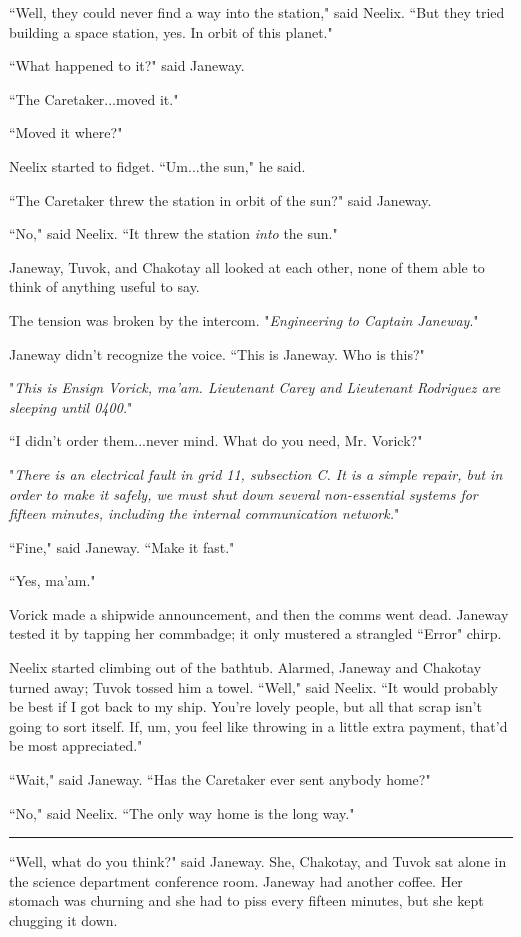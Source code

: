 \documentclass[twoside,letterpaper,12pt]{memoir}
\begin{document}
``Well, they could never find a way into the station," said Neelix. ``But they tried building a space station, yes. In orbit of this planet."

``What happened to it?" said Janeway.

``The Caretaker...moved it."

``Moved it where?"

Neelix started to fidget. ``Um...the sun," he said.

``The Caretaker threw the station in orbit of the sun?" said Janeway.

``No," said Neelix. ``It threw the station \textit{into} the sun."

Janeway, Tuvok, and Chakotay all looked at each other, none of them able to think of anything useful to say.

The tension was broken by the intercom. "\textit{Engineering to Captain Janeway}."

Janeway didn't recognize the voice. ``This is Janeway. Who is this?"

"\textit{This is Ensign Vorick, ma'am. Lieutenant Carey and Lieutenant Rodriguez are sleeping until 0400.}"

``I didn't order them...never mind. What do you need, Mr. Vorick?"

"\textit{There is an electrical fault in grid 11, subsection C. It is a simple repair, but in order to make it safely, we must shut down several non-essential systems for fifteen minutes, including the internal communication network.}"

``Fine," said Janeway. ``Make it fast."

``Yes, ma'am."

Vorick made a shipwide announcement, and then the comms went dead. Janeway tested it by tapping her commbadge; it only mustered a strangled ``Error" chirp.

Neelix started climbing out of the bathtub. Alarmed, Janeway and Chakotay turned away; Tuvok tossed him a towel. ``Well," said Neelix. ``It would probably be best if I got back to my ship. You're lovely people, but all that scrap isn't going to sort itself. If, um, you feel like throwing in a little extra payment, that'd be most appreciated."

``Wait," said Janeway. ``Has the Caretaker ever sent anybody home?"

``No," said Neelix. ``The only way home is the long way."

\fancybreak{\rule{3cm}{0.4 pt}}
``Well, what do you think?" said Janeway. She, Chakotay, and Tuvok sat alone in the science department conference room. Janeway had another coffee. Her stomach was churning and she had to piss every fifteen minutes, but she kept chugging it down.
\end{document}
